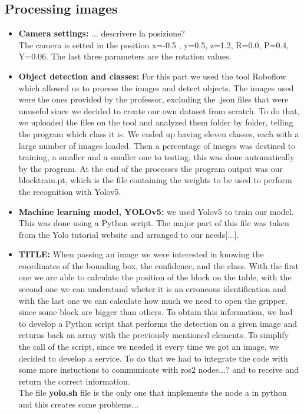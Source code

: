 \documentclass[12pt,a4paper]{article}
\begin{document}
\subsection{Processing images}\label{subsec:imageproc}
\begin{itemize}
    \item \textbf{Camera settings:} ... descrivere la posizione?\\
    The camera is setted in the position x=-0.5 , y=0.5, z=1.2, R=0.0, P=0.4, Y=0.06. The last three parameters are the rotation values.
    \item \textbf{Object detection and classes:} For this part we used the tool Roboflow which allowed us to process the images and detect objects. The images used were the ones provided by the professor, excluding the .json files that were unuseful since we decided to create our own dataset from scratch. To do that, we uploaded the files on the tool and analyzed them folder by folder, telling the program which class it is. We ended up having eleven classes, each with a large number of images loaded. Then a percentage of imeges was destined to training, a smaller and a smaller one to testing, this was done automatically by the program. At the end of the processes the program output was our blocktrain.pt, which is the file containing the weights to be used to perform the recognition with Yolov5.
    \item \textbf{Machine learning model, YOLOv5:} we used Yolov5 to train our model. This was done using a Python script. The major part of this file was taken from the Yolo tutorial website and arranged to our needs[...]. 
    \item \textbf{TITLE:} When passing an image we were interested in knowing the coordinates of the bounding box, the confidence, and the class. With the first one we are able to calculate the position of the block on the table, with the second one we can understand wheter it is an erroneous identification and with the last one we can calculate how much we need to open the gripper, since some block are bigger than others. To obtain this information, we had to develop a Python script that performs the detection on a given image and returns back an array with the previously mentioned elements. To simplify the call of the script, since we needed it every time we got an image, we decided to develop a service. To do that we had to integrate the code with some more instuctions to communicate with ros2 nodes...? and to receive and return the correct information.\\
    The file \textbf{yolo.sh} file is the only one that implements the node a in python and this creates some problems...
\end{itemize}
\end{document}
